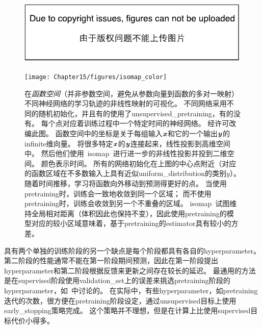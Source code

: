 

\begin{figure}[!htb]
\ifOpenSource
\centerline{\includegraphics{figure.pdf}}
\else
\centerline{\texttt{[image: Chapter15/figures/isomap\_color]}}
\fi
\caption{在\emph{函数空间}（并非参数空间，避免从参数向量到函数的多对一映射）不同神经网络的学习轨迹的非线性映射的可视化。
不同网络采用不同的随机初始化，并且有的使用了\gls{unsupervised_pretraining}，有的没有。
每个点对应着训练过程中一个特定时间的神经网络。
经\citet{Erhan+al-2010-small}许可改编此图。
函数空间中的坐标是关于每组输入$\boldsymbol{\mathit{x}}$和它的一个输出$\boldsymbol{\mathit{y}}$的\gls{infinite}维向量。
\cite{Erhan+al-2010-small}将很多特定$\boldsymbol{\mathit{x}}$的$\boldsymbol{\mathit{y}}$连接起来，线性投影到高维空间中。
然后他们使用~\gls{isomap}~\citep{Tenenbaum2000-isomap}进行进一步的非线性投影并投到二维空间。
颜色表示时间。
所有的网络初始化在上图的中心点附近（对应的函数区域在不多数输入上具有近似\gls{uniform_distribution}的类别$y$）。
随着时间推移，学习将函数向外移动到预测得更好的点。
当使用\gls{pretraining}时，训练会一致地收敛到同一个区域；
而不使用\gls{pretraining}时，训练会收敛到另一个不重叠的区域。
\gls{isomap}~试图维持全局相对距离（体积因此也保持不变），因此使用\gls{pretraining}的模型对应的较小区域意味着，基于\gls{pretraining}的\gls{estimator}具有较小的方差。
}
\label{fig:chap15_isomap}
\end{figure}



具有两个单独的训练阶段的另一个缺点是每个阶段都具有各自的\gls{hyperparameter}。
第二阶段的性能通常不能在第一阶段期间预测，因此在第一阶段提出\gls{hyperparameter}和第二阶段根据反馈来更新之间存在较长的延迟。
最通用的方法是在\gls{supervised}阶段使用\gls{validation_set}上的误差来挑选\gls{pretraining}阶段的\gls{hyperparameter}，如~\cite{Larochelle-jmlr-2009}中讨论的。
在实际中，有些\gls{hyperparameter}，如\gls{pretraining}迭代的次数，很方便在\gls{pretraining}阶段设定，通过\gls{unsupervised}目标上使用\gls{early_stopping}策略完成。
这个策略并不理想，但是在计算上比使用\gls{supervised}目标代价小得多。


